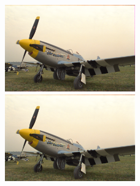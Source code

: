 \begin{figure}[h!]

       \includegraphics[width=0.5\textwidth]{imagenes/img9_demosicing_spline.png}
           \hfill
        \includegraphics[width=0.5\textwidth]{imagenes/img9_demosicing_quality.png}

\end{figure}



